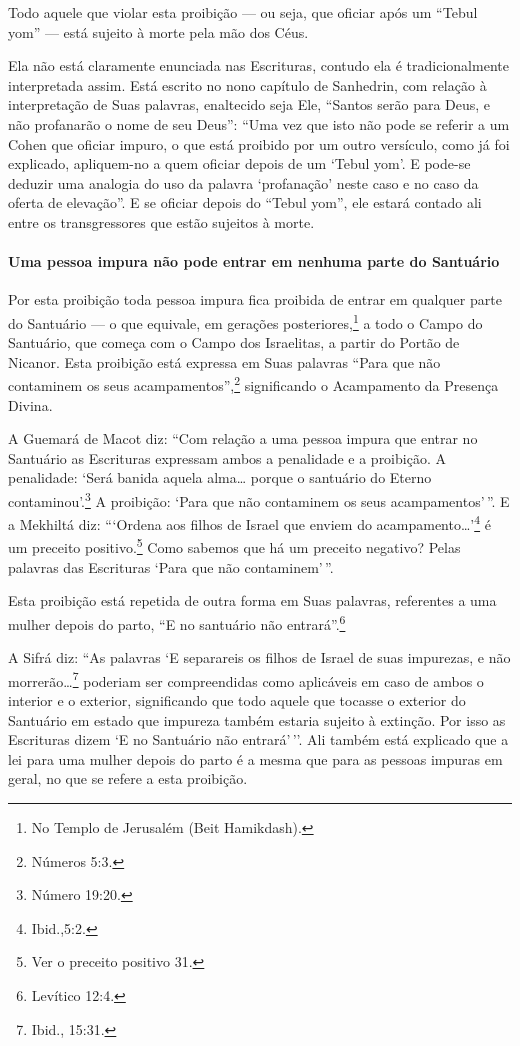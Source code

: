 Todo aquele que violar esta proibição --- ou seja, que oficiar após um
``Tebul yom'' --- está sujeito à morte pela mão dos Céus.

Ela não está claramente enunciada nas Escrituras, contudo ela é
tradicionalmente interpretada assim. Está escrito no nono capítulo de
Sanhedrin, com relação à interpretação de Suas palavras, enaltecido seja
Ele, ``Santos serão para Deus, e não profanarão o nome de seu Deus'': ``Uma vez que isto não
pode se referir a um Cohen que oficiar impuro, o que está proibido
por um outro versículo, como já foi explicado, apliquem-no a quem
oficiar depois de um `Tebul yom'. E pode-se deduzir uma analogia do uso
da palavra `profanação' neste caso e no caso da oferta de elevação''. E
se oficiar depois do ``Tebul yom'', ele estará contado ali entre os
transgressores que estão sujeitos à morte.

\paragraph{Uma pessoa impura não pode entrar em nenhuma parte do Santuário}

Por esta proibição toda pessoa impura fica proibida de entrar em
qualquer parte do Santuário --- o que equivale, em gerações
posteriores,\footnote{No Templo de Jerusalém (Beit Hamikdash).} a todo o Campo do Santuário, que
começa com o Campo dos Israelitas, a partir do Portão de Nicanor. Esta
proibição está expressa em Suas palavras ``Para que não contaminem os
seus acampamentos'',\footnote{Números 5:3.} significando o Acampamento da
Presença Divina.

A Guemará de Macot diz: ``Com relação a uma pessoa impura que entrar no
Santuário as Escrituras expressam ambos a penalidade e a proibição. A
penalidade: `Será banida aquela alma\ldots{} porque o santuário do Eterno
contaminou'.\footnote{Número 19:20.} A proibição: `Para que não contaminem os
seus acampamentos'\,''. E a Mekhiltá diz: ```Ordena aos filhos de Israel
que enviem do acampamento\ldots{}'\footnote{Ibid.,5:2.} é um preceito
positivo.\footnote{Ver o preceito positivo 31.} Como sabemos que há um preceito
negativo? Pelas palavras das Escrituras `Para que não contaminem'\,''.

Esta proibição está repetida de outra forma em Suas palavras, referentes
a uma mulher depois do parto, ``E no santuário não entrará''.\footnote{Levítico
12:4.}

A Sifrá diz: ``As palavras `E separareis os filhos de Israel de suas
impurezas, e não morrerão\ldots{}\footnote{Ibid., 15:31.} poderiam ser compreendidas
como aplicáveis em caso de ambos o interior e o exterior, significando
que todo aquele que tocasse o exterior do Santuário em estado que
impureza também estaria sujeito à extinção. Por isso as Escrituras dizem
`E no Santuário não entrará'\,''. Ali também está explicado que a lei para
uma mulher depois do parto é a mesma que para as pessoas impuras em
geral, no que se refere a esta proibição.

